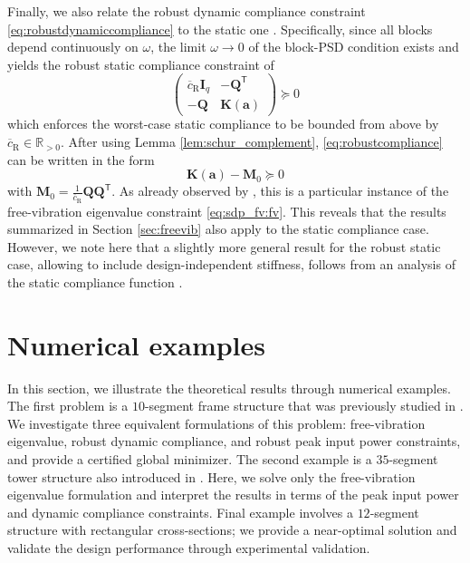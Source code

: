 \documentclass[preprint,3p]{elsarticle}
\newcommand{\T}{^{\mathsf T}}
\newcommand{\R}{\mathrm{R}}
\numberwithin{equation}{section}
\begin{document}
Finally, we also relate the robust dynamic compliance constraint \eqref{eq:robustdynamiccompliance} to the static one \citep{Tyburec2023global}. Specifically, since all blocks depend continuously on $\omega$, the limit $\omega\rightarrow0$ of the block-PSD condition exists and yields the robust static compliance constraint of \citet{BenTal1997}
%
\begin{equation}\label{eq:robustcompliance}
  \begin{pmatrix}
    \overline{c}_\R\mathbf{I}_q & - \mathbf{Q}\T\\
    -\mathbf{Q} & \mathbf{K}(\mathbf{a})
  \end{pmatrix} \succeq 0
\end{equation}
%
which enforces the worst-case static compliance to be bounded from above by $\overline{c}_\R \in \mathbb{R}_{>0}$.  After using Lemma \ref{lem:schur_complement}, \eqref{eq:robustcompliance} can be written in the form
%
\begin{equation}\label{eq:robustcompliance_fv}
  \mathbf{K}(\mathbf{a}) - \mathbf{M}_0 \succeq 0
\end{equation}
%
with $\mathbf{M}_0 = \frac{1}{\overline{c}_\R}\mathbf{Q} \mathbf{Q}\T$. As already observed by \citet{Kanno2015}, this is a particular instance of the free-vibration eigenvalue constraint \eqref{eq:sdp_fv:fv}. This reveals that the results summarized in Section \ref{sec:freevib} also apply to the static compliance case. However, we note here that a slightly more general result for the robust static case, allowing to include design-independent stiffness, follows from an analysis of the static compliance function \citep{Tyburec2023global}.


\section{Numerical examples}\label{sec:examples}

In this section, we illustrate the theoretical results through numerical examples. The first problem is a $10$-segment frame structure that was previously studied in \citep{Ni2014}. We investigate three equivalent formulations of this problem: free-vibration eigenvalue, robust dynamic compliance, and robust peak input power constraints, and provide a certified global minimizer. The second example is a $35$-segment tower structure also introduced in \citep{Ni2014}. Here, we solve only the free-vibration eigenvalue formulation and interpret the results in terms of the peak input power and dynamic compliance constraints. Final example involves a $12$-segment structure with rectangular cross-sections; we provide a near-optimal solution and validate the design performance through experimental validation.
\end{document}

